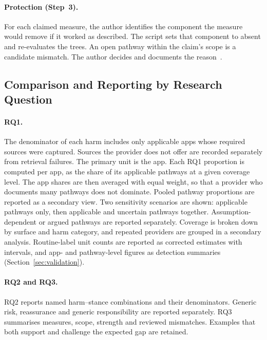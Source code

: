 \paragraph{Protection (Step~3).} For each claimed measure, the author identifies the component
the measure would remove if it worked as described. The script sets that component to absent and
re-evaluates the trees. An open pathway within the claim's scope is a candidate mismatch. The
author decides and documents the reason~\parencite[\S4.5]{knabenhans2026harms}.

\subsection{Comparison and Reporting by Research Question}
\label{sec:comparison}
\paragraph{RQ1.} The denominator of each harm includes only applicable apps whose required
sources were captured. Sources the provider does not offer are recorded separately from
retrieval failures. The primary unit is the app. Each RQ1 proportion is computed per app, as the
share of its applicable pathways at a given coverage level. The app shares are then averaged with
equal weight, so that a provider who documents many pathways does not dominate. Pooled pathway
proportions are reported as a secondary view. Two sensitivity scenarios are shown:
applicable pathways only, then applicable and uncertain pathways together. Assumption-dependent
or argued pathways are reported separately. Coverage is broken down by surface and harm
category, and repeated providers are grouped in a secondary analysis. Routine-label unit counts
are reported as corrected estimates with intervals, and app- and pathway-level figures as
detection summaries (Section~\ref{sec:validation}).

\paragraph{RQ2 and RQ3.} RQ2 reports named harm--stance combinations and their denominators.
Generic risk, reassurance and generic responsibility are reported separately. RQ3 summarises
measures, scope, strength and reviewed mismatches. Examples that both support and challenge the
expected gap are retained.

